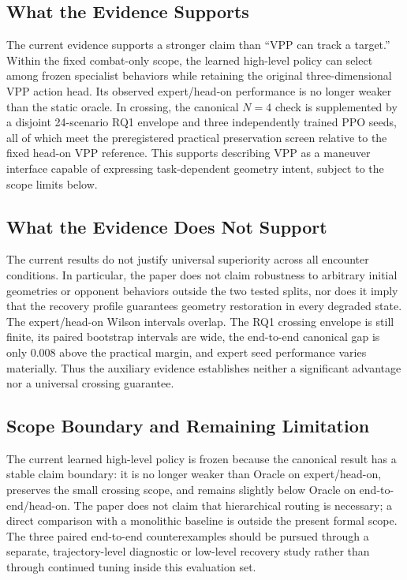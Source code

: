 \documentclass[5p,times]{elsarticle} %
\begin{document}
\subsection{What the Evidence Supports}

The current evidence supports a stronger claim than ``VPP can track a target.'' Within the fixed combat-only scope, the learned high-level policy can select among frozen specialist behaviors while retaining the original three-dimensional VPP action head. Its observed expert/head-on performance is no longer weaker than the static oracle. In crossing, the canonical $N=4$ check is supplemented by a disjoint 24-scenario RQ1 envelope and three independently trained PPO seeds, all of which meet the preregistered practical preservation screen relative to the fixed head-on VPP reference. This supports describing VPP as a maneuver interface capable of expressing task-dependent geometry intent, subject to the scope limits below.

\subsection{What the Evidence Does Not Support}

The current results do not justify universal superiority across all encounter conditions. In particular, the paper does not claim robustness to arbitrary initial geometries or opponent behaviors outside the two tested splits, nor does it imply that the recovery profile guarantees geometry restoration in every degraded state. The expert/head-on Wilson intervals overlap. The RQ1 crossing envelope is still finite, its paired bootstrap intervals are wide, the end-to-end canonical gap is only 0.008 above the practical margin, and expert seed performance varies materially. Thus the auxiliary evidence establishes neither a significant advantage nor a universal crossing guarantee.

\subsection{Scope Boundary and Remaining Limitation}

The current learned high-level policy is frozen because the canonical result has a stable claim boundary: it is no longer weaker than Oracle on expert/head-on, preserves the small crossing scope, and remains slightly below Oracle on end-to-end/head-on. The paper does not claim that hierarchical routing is necessary; a direct comparison with a monolithic baseline is outside the present formal scope. The three paired end-to-end counterexamples should be pursued through a separate, trajectory-level diagnostic or low-level recovery study rather than through continued tuning inside this evaluation set.
\end{document}
